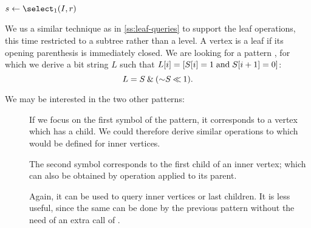 \begin{algorithm}
\begin{algorithmic}
	\State $s \gets \select_1(I, r)$
	 
		\State {}
	\Else
		\State {}
	\EndIf
\EndFunction
\end{algorithmic}
\end{algorithm}

\bigbreak

We us a similar technique as in \ref{ss:leaf-queries} to support the leaf operations, this time restricted to a subtree rather than a level.
A vertex is a leaf if its opening parenthesis is immediately closed.
We are looking for a pattern \str{()}, for which we derive a bit string $L$ such that $L[i] = [S[i] = 1 \mathrel{\textrm{and}} S[i+1] = 0]$:
$$L = S \mathbin{\&} (\mathord{\sim} S \mathbin{\ll} 1). $$

\begin{algorithm}
\begin{algorithmic}
		\State {}
	\Else
		\State {}
	\EndIf
\EndFunction
\end{algorithmic}
\end{algorithm}

\begin{algorithm}
\begin{algorithmic}	
 
		\State {}
	\Else
		\State {}
	\EndIf
\EndFunction
\end{algorithmic}
\end{algorithm}

\begin{algorithm}
\begin{algorithmic}
		\State {}
	\Else
		\State {}
	\EndIf
\EndFunction
\end{algorithmic}
\end{algorithm}

\bigbreak

We may be interested in the two other patterns:
\begin{description}
	\item[\str{((}]
	If we focus on the first symbol of the pattern, it corresponds to a vertex which has a child.
	We could therefore derive similar operations to \leafAny{} which would be defined for inner vertices.
	
	The second symbol corresponds to the first child of an inner vertex; which can also be obtained by \childFirst{} operation applied to its parent.
	
	\item[\str{))}]
	Again, it can be used to query inner vertices or last children.
	It is less useful, since the same can be done by the previous pattern without the need of an extra call of \findOpen{}.
\end{description}

